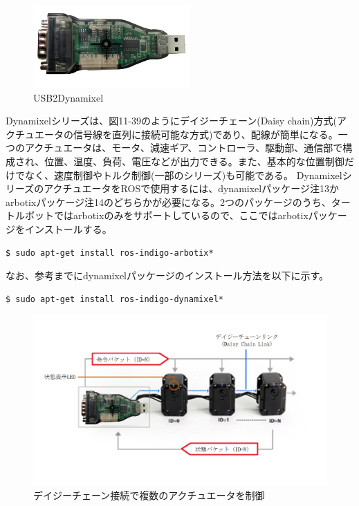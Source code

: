 \begin{figure}[htp]
  \centering
  \includegraphics[width=6cm]{pictures/chapter11/pic_11_38.png}
  \caption{USB2Dynamixel}
\end{figure}

Dynamixelシリーズは、図11-39のようにデイジーチェーン(Daisy chain)方式(アクチュエータの信号線を直列に接続可能な方式)であり、配線が簡単になる。一つのアクチュエータは、モータ、減速ギア、コントローラ、駆動部、通信部で構成され、位置、温度、負荷、電圧などが出力できる。また、基本的な位置制御だけでなく、速度制御やトルク制御(一部のシリーズ)も可能である。
DynamixelシリーズのアクチュエータをROSで使用するには、dynamixelパッケージ注13かarbotixパッケージ注14のどちらかが必要になる。2つのパッケージのうち、タートルボットではarbotixのみをサポートしているので、ここではarbotixパッケージをインストールする。

\begin{lstlisting}[language=ROS]
$ sudo apt-get install ros-indigo-arbotix*
\end{lstlisting}

なお、参考までにdynamixelパッケージのインストール方法を以下に示す。

\begin{lstlisting}[language=ROS]
$ sudo apt-get install ros-indigo-dynamixel*
\end{lstlisting}

\begin{figure}[htp]
  \centering
  \includegraphics[width=12cm]{pictures/chapter11/pic_11_39.png}
  \caption{デイジーチェーン接続で複数のアクチュエータを制御}
\end{figure}


